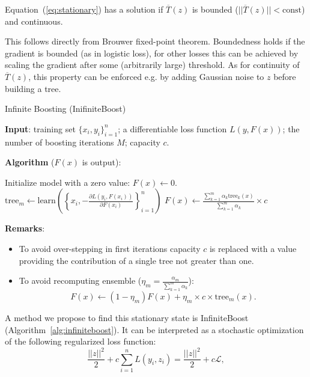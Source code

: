 \begin{theorem}
Equation~(\ref{eq:stationary}) has a solution if  
$\overline{T}(z)$ is bounded ($|| \overline{T}(z) || < \text{const}$) and continuous.
\end{theorem}
This follows directly from Brouwer fixed-point theorem.
Boundedness holds if the gradient is bounded (as in logistic loss),
for other losses this can be achieved by scaling the gradient after some (arbitrarily large) threshold.
As for continuity of $\overline{T}(z)$,
this property can be enforced e.g. by adding Gaussian noise to $z$ before building a tree.

\begin{algorithm}[!h]
  \caption{Infinite Boosting (InifiniteBoost)}\label{alg:infiniteboost}
  {\bf Input}: training set $\{x_i, y_i\}_{i=1}^n$; a differentiable loss function $L(y, F(x))$; the number of boosting iterations $M$; capacity $c$.

  {\bf Algorithm} ($F(x)$ is output):
  \begin{algorithmic}
    \State Initialize model with a zero value: $F(x) \gets 0$.
      \State $\text{tree}_m \gets \text{learn}\left(\left\{x_i, -\frac{\partial L(y_i, F(x_i))}{\partial F(x_i)}\right\}_{i=1}^n\right)$
      \State $F(x) \gets  \frac{\sum_{k=1}^m \alpha_k \text{tree}_k(x)}{\sum_{k=1}^m \alpha_k} \times c$
    \EndFor
  \end{algorithmic}

  {\bf Remarks}:
  \begin{itemize}
    \item To avoid over-stepping in first iterations capacity $c$ is replaced with a value providing the contribution of a single tree not greater than one.
    \item To avoid recomputing ensemble ($\eta_m = \frac{\alpha_m}{\sum_{k=1}^m \alpha_k}$):
      \begin{equation*}
        F(x) \gets (1-\eta_m)F(x) + \eta_m \times c \times \text{tree}_m(x).
      \end{equation*}
  \end{itemize}
\end{algorithm}
A method we propose to find this stationary state is InfiniteBoost (Algorithm~\ref{alg:infiniteboost}).
It can be interpreted as a stochastic optimization of the following regularized loss function:
\begin{equation*}
  \dfrac{|| z ||^2}{2} + c \sum_{i=1}^n L(y_i, z_i) = \dfrac{|| z ||^2}{2} + c \mathcal{L},
\end{equation*}
